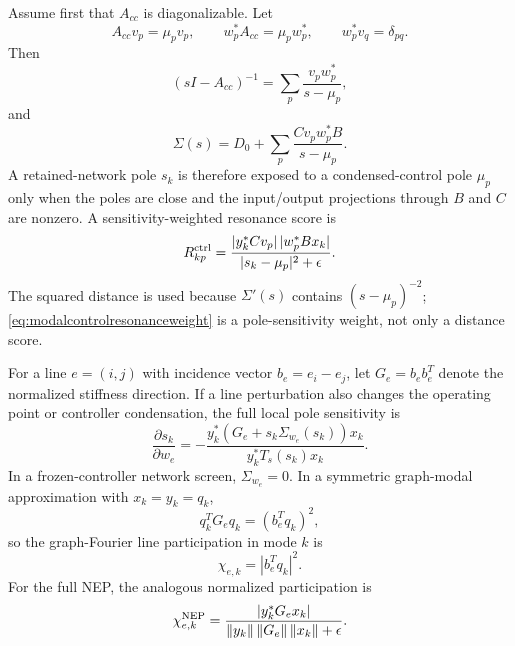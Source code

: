 \documentclass[journal]{IEEEtran}
\newcommand{\norm}[1]{\left\lVert #1 \right\rVert}
\begin{document}
Assume first that $A_{cc}$ is diagonalizable. Let
\begin{equation}
A_{cc}v_p=\mu_pv_p,\qquad
w_p^\ast A_{cc}=\mu_pw_p^\ast,\qquad
w_p^\ast v_q=\delta_{pq}.
\end{equation}
Then
\begin{equation}
(sI-A_{cc})^{-1}
=\sum_p\frac{v_pw_p^\ast}{s-\mu_p},
\label{eq:controlresolventexpansion}
\end{equation}
and
\begin{equation}
\Sigma(s)
=D_0+\sum_p
\frac{Cv_pw_p^\ast B}{s-\mu_p}.
\label{eq:selfenergycontrolpoleexpansion}
\end{equation}
A retained-network pole $s_k$ is therefore exposed to a condensed-control pole $\mu_p$ only when the poles are close and the input/output projections through $B$ and $C$ are nonzero. A sensitivity-weighted resonance score is
\begin{equation}
R_{kp}^{\rm ctrl}
=
\frac{
|y_k^\ast C v_p|\,|w_p^\ast Bx_k|
}{
|s_k-\mu_p|^2+\epsilon
}.
\label{eq:modalcontrolresonanceweight}
\end{equation}
The squared distance is used because $\Sigma'(s)$ contains $(s-\mu_p)^{-2}$; \eqref{eq:modalcontrolresonanceweight} is a pole-sensitivity weight, not only a distance score.

For a line $e=(i,j)$ with incidence vector $b_e=e_i-e_j$, let $G_e=b_eb_e^T$ denote the normalized stiffness direction. If a line perturbation also changes the operating point or controller condensation, the full local pole sensitivity is
\begin{equation}
\frac{\partial s_k}{\partial w_e}
=
-
\frac{
y_k^\ast\left(G_e+s_k\Sigma_{w_e}(s_k)\right)x_k
}{
y_k^\ast T_s(s_k)x_k
}.
\label{eq:linesenspolefull}
\end{equation}
In a frozen-controller network screen, $\Sigma_{w_e}=0$. In a symmetric graph-modal approximation with $x_k=y_k=q_k$,
\begin{equation}
q_k^TG_eq_k=(b_e^Tq_k)^2,
\label{eq:linegraphfourierparticipation}
\end{equation}
so the graph-Fourier line participation in mode $k$ is
\begin{equation}
\chi_{e,k}=|b_e^Tq_k|^2.
\label{eq:lineparticipation}
\end{equation}
For the full NEP, the analogous normalized participation is
\begin{equation}
\chi_{e,k}^{\rm NEP}
=
\frac{|y_k^\ast G_ex_k|}
{\norm{y_k}\norm{G_e}\norm{x_k}+\epsilon}.
\label{eq:lineparticipationnep}
\end{equation}
\end{document}
